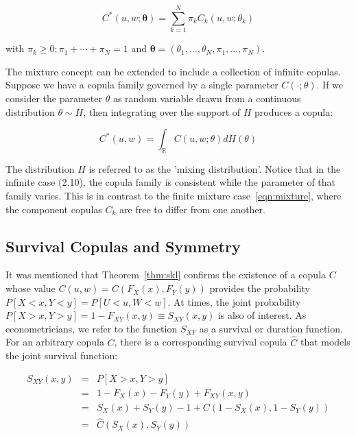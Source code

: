 \documentclass[12pt]{article}
\begin{document}
\begin{equation} \label{eqn:mixture}
    C^{\ast} \left(u, w; \boldsymbol{\theta} \right) = \sum_{k=1}^{N} \pi_{k} C_{k} \left(u, w; \theta _{k} \right)
\end{equation}

with $\pi _{k} \geq 0; \pi_{1} + \cdots + \pi_{N} = 1$ and $\boldsymbol{\theta} = \left(\theta_{1}, ..., \theta_{N}, \pi_{1}, ..., \pi_{N} \right)$.

The mixture concept can be extended to include a collection of infinite copulas. Suppose we have a copula family governed by a single parameter $C\left(\cdot;\theta\right)$. If we consider the parameter $\theta$ as random variable drawn from a continuous distribution $\theta\sim H$, then integrating over the support of $H$ produces a copula:

\begin{equation}
	C^{\ast}\left( u,w\right) =\int_{\mathbb{R}}C\left(u,w;\theta\right)dH\left(\theta\right)
\end{equation}

The distribution $H$ is referred to as the 'mixing distribution'. Notice that in the infinite case (2.10), the copula family is consistent while the parameter of that family varies. This is in contrast to the finite mixture case~\ref{eqn:mixture}, where the component copulas $C_{k}$ are free to differ from one another.


\subsection{Survival Copulas and Symmetry}

It was mentioned that Theorem~\ref{thm:skl} confirms the existence of a copula $C$ whose value $C\left(u,w\right) = C\left(F_{X}\left(x\right), F_{Y}\left(y\right)\right)$ provides the probability $P\left[X < x, Y < y\right] = P\left[U < u, W < w\right]$. At times, the joint probability $P\left[X > x, Y > y\right] = 1-F_{XY}\left(x,y\right)\equiv S_{XY}\left(x,y\right)$ is also of interest. As econometricians, we refer to the function $S_{XY}$ as a survival or duration function. For an arbitrary copula $C$, there is a corresponding survival copula $\hat{C}$ that models the joint survival function:

\begin{eqnarray*}
S_{XY}\left(x,y\right) &=& P\left[X > x, Y > y\right] \\
						&=& 1-F_{X}\left(x\right) - F_{Y}\left(y\right) + F_{XY}\left(x,y\right) \\
						&=& S_{X}\left(x\right) + S_{Y}\left(y\right) - 1 + C\left(1 - S_{X}\left(x\right), 1 - S_{Y}\left(y\right)\right) \\
						&=& \hat{C}\left(S_{X}\left(x\right), S_{Y}\left(y\right)\right)
\end{eqnarray*}
\end{document}
